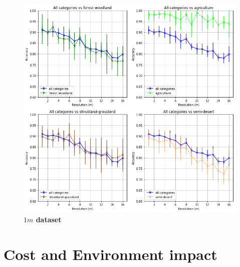 \begin{figure}[h!]
	\centering
	\includegraphics[width=\textwidth]{Figures/results/acc_res_by_category_1m.png}
	\captionsetup{width=1\linewidth}
	\caption{\textbf{$1m$ dataset}}
	\label{fig:acc_by_cat_1m}
\end{figure}



\section{Cost and Environment impact}
